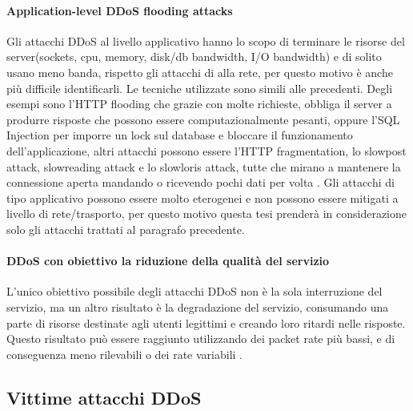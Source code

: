 \paragraph{Application-level DDoS flooding attacks} %
Gli attacchi DDoS al livello applicativo hanno lo scopo di terminare le risorse del server(sockets, cpu, memory, disk/db bandwidth, I/O bandwidth) e di solito usano meno banda, rispetto gli attacchi di alla rete, per questo motivo è anche più difficile identificarli. Le tecniche utilizzate sono simili alle precedenti. Degli esempi sono l'HTTP flooding che grazie con molte richieste, obbliga il server a produrre risposte che possono essere computazionalmente pesanti, oppure l'SQL Injection per imporre un lock sul database e bloccare il funzionamento dell'applicazione, altri attacchi possono essere l'HTTP fragmentation, lo slowpost attack, slowreading attack e lo slowloris attack, tutte che mirano a mantenere la connessione aperta mandando o ricevendo pochi dati per volta \cite{ddos_survey_1}.
Gli attacchi di tipo applicativo possono essere molto eterogenei e non possono essere mitigati a livello di rete/trasporto, per questo motivo questa tesi prenderà in considerazione solo gli attacchi trattati al paragrafo precedente.

\paragraph{DDoS con obiettivo la riduzione della qualità del servizio}


L'unico obiettivo possibile degli attacchi DDoS non è la sola interruzione del servizio, ma un altro risultato è la degradazione del servizio, consumando una parte di risorse destinate agli utenti legittimi e creando loro ritardi nelle risposte. Questo risultato può essere raggiunto utilizzando dei packet rate più bassi, e di conseguenza meno rilevabili o dei rate variabili \cite{ddos_survey_3, ddos_survey_4}.

\subsection{Vittime attacchi DDoS}

